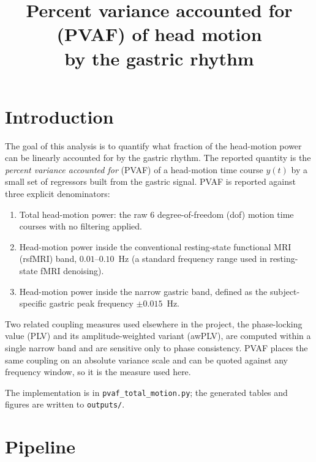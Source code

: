 \documentclass[11pt]{article}
\title{\bfseries Percent variance accounted for (PVAF) of head motion\\
by the gastric rhythm}
\author{}
\date{}
\begin{document}
\maketitle

\section{Introduction}

The goal of this analysis is to quantify what fraction of the
head-motion power can be linearly accounted for by the gastric rhythm.
The reported quantity is the \emph{percent variance accounted for}
(PVAF) of a head-motion time course $y(t)$ by a small set of regressors
built from the gastric signal. PVAF is reported against three explicit
denominators:

\begin{enumerate}
\item Total head-motion power: the raw 6 degree-of-freedom (dof) motion
time courses with no filtering applied.
\item Head-motion power inside the conventional resting-state
functional MRI (rsfMRI) band, $0.01$--$0.10$~Hz (a standard frequency
range used in resting-state fMRI denoising).
\item Head-motion power inside the narrow gastric band, defined as the
subject-specific gastric peak frequency $\pm 0.015$~Hz.
\end{enumerate}

Two related coupling measures used elsewhere in the project, the
phase-locking value (PLV) and its amplitude-weighted variant (awPLV),
are computed within a single narrow band and are sensitive only to
phase consistency. PVAF places the same coupling on an absolute
variance scale and can be quoted against any frequency window, so it is
the measure used here.

The implementation is in \texttt{pvaf\_total\_motion.py}; the generated
tables and figures are written to \texttt{outputs/}.

\section{Pipeline}
\end{document}
